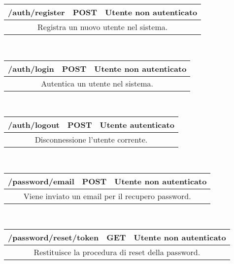 \begin{table}[h]
	\begin{tabular}{|p{}|p{}|p{}|}
		\toprule
		\textbf{/auth/register} & \textbf{POST} & \textbf{Utente non autenticato} \\ \midrule
		\multicolumn{3}{|c|}{Registra un nuovo utente nel sistema.} \\
		\bottomrule
	\end{tabular}\\
	\par\bigskip
	
	\begin{tabular}{|p{}|p{}|p{}|}
		\toprule
		\textbf{/auth/login} & \textbf{POST} & \textbf{Utente non autenticato} \\ \midrule
		\multicolumn{3}{|c|}{Autentica un utente nel sistema.} \\
		\bottomrule
	\end{tabular}\\
	\par\bigskip
	
	\begin{tabular}{|p{}|p{}|p{}|}
		\toprule
		\textbf{/auth/logout} & \textbf{POST} & \textbf{Utente autenticato} \\ \midrule
		\multicolumn{3}{|c|}{Disconnessione l'utente corrente.} \\
		\bottomrule
	\end{tabular}\\
	\par\bigskip
	
	\begin{tabular}{|p{}|p{}|p{}|}
		\toprule
		\textbf{/password/email} & \textbf{POST} & \textbf{Utente non autenticato} \\ \midrule
		\multicolumn{3}{|c|}{Viene inviato un email per il recupero password.} \\
		\bottomrule
	\end{tabular}\\
	\par\bigskip
	
	\begin{tabular}{|p{}|p{}|p{}|}
		\toprule
		\textbf{/password/reset/{token}} & \textbf{GET} & \textbf{Utente non autenticato} \\ \midrule
		\multicolumn{3}{|c|}{Restituisce la procedura di reset della password.} \\
		\bottomrule
	\end{tabular}\\
	\par\bigskip
	

\end{table}

